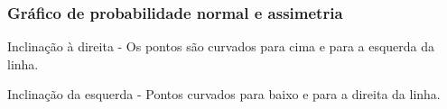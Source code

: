 \begin{frame}
\frametitle{Gráfico de probabilidade normal e assimetria}

{
\justifying
Inclinação à direita - Os pontos são curvados para cima e para a esquerda da linha.
}

{
\justifying
Inclinação da esquerda - Pontos curvados para baixo e para a direita da linha.
}


\end{frame}
